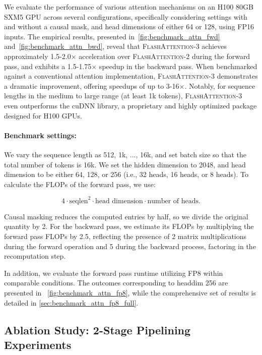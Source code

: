 \begin{enumerate}
We evaluate the performance of various attention mechanisms on an H100 80GB SXM5 GPU across several configurations, specifically considering settings with and without a causal mask, and head dimensions of either 64 or 128, using FP16 inputs. The empirical results, presented in~\cref{fig:benchmark_attn_fwd} and~\cref{fig:benchmark_attn_bwd}, reveal that \textsc{FlashAttention-3} achieves approximately 1.5-2.0$\times$ acceleration over \textsc{FlashAttention-2} during the forward pass, and exhibits a 1.5-1.75$\times$ speedup in the backward pass. When benchmarked against a conventional attention implementation, \textsc{FlashAttention-3} demonstrates a dramatic improvement, offering speedups of up to 3-16$\times$. Notably, for sequence lengths in the medium to large range (at least 1k tokens), \textsc{FlashAttention-3} even outperforms the cuDNN library, a proprietary and highly optimized package designed for H100 GPUs.

\paragraph{Benchmark settings:} We vary the sequence length as 512, 1k, ..., 16k, and set batch size so that the total number of tokens is 16k. We set the hidden dimension to 2048, and head dimension to be either 64, 128, or 256 (i.e., 32 heads, 16 heads, or 8 heads). To calculate the FLOPs of the forward pass, we use:

\begin{equation*}
  4 \cdot \text{seqlen}^2 \cdot \text{head dimension} \cdot \text{number of heads}.
\end{equation*}

Causal masking reduces the computed entries by half, so we divide the original quantity by 2. For the backward pass, we estimate its FLOPs by multiplying the forward pass FLOPs by 2.5, reflecting the presence of 2 matrix multiplications during the forward operation and 5 during the backward process, factoring in the recomputation step.

In addition, we evaluate the forward pass runtime utilizing FP8 within comparable conditions. The outcomes corresponding to headdim 256 are presented in ~\cref{fig:benchmark_attn_fp8}, while the comprehensive set of results is detailed in \cref{sec:benchmark_attn_fp8_full}.

\subsection{Ablation Study: 2-Stage Pipelining Experiments}
\label{sec:2-stage-pipelining-experiments}


\end{enumerate}
